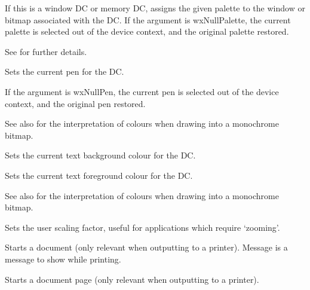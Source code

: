 \label{wxdcsetpalette}


If this is a window DC or memory DC, assigns the given palette to the window
or bitmap associated with the DC. If the argument is wxNullPalette, the current
palette is selected out of the device context, and the original palette
restored.

See  for further details. 


\label{wxdcsetpen}


Sets the current pen for the DC.

If the argument is wxNullPen, the current pen is selected out of the device
context, and the original pen restored.

See also  for the interpretation of colours
when drawing into a monochrome bitmap.


\label{wxdcsettextbackground}


Sets the current text background colour for the DC.


\label{wxdcsettextforeground}


Sets the current text foreground colour for the DC.

See also  for the interpretation of colours
when drawing into a monochrome bitmap.


\label{wxdcsetuserscale}


Sets the user scaling factor, useful for applications which require
`zooming'.


\label{wxdcstartdoc}


Starts a document (only relevant when outputting to a printer).
Message is a message to show while printing.


\label{wxdcstartpage}


Starts a document page (only relevant when outputting to a printer).
